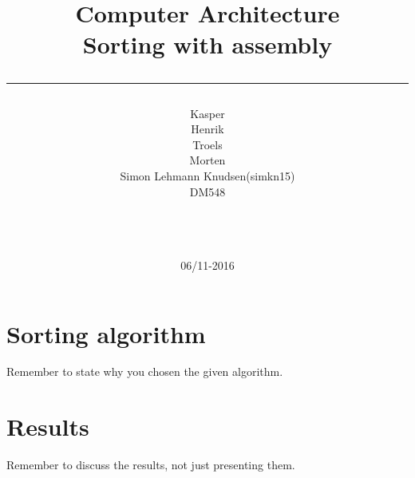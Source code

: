 \documentclass[a4paper,10pt]{article}
\title{Computer Architecture \\Sorting with assembly \\\rule{10cm}{0.5mm}}
\author{Kasper\\Henrik\\Troels\\Morten\\Simon Lehmann Knudsen(simkn15)
\\ DM548\\\rule{5.5cm}{0.5mm}\\}
\date{06/11-2016}
\begin{document}
\maketitle

\vfill

\newpage
\tableofcontents

\newpage
\section{Sorting algorithm}
Remember to state why you chosen the given algorithm.

\section{Results}
Remember to discuss the results, not just presenting them.
\end{document}

